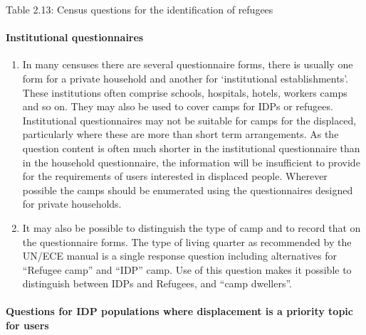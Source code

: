 \documentclass[
]{article}
\begin{document}
Table 2.13: Census questions for the identification of refugees

\hypertarget{institutional-questionnaires-1}{%
\paragraph{Institutional questionnaires}\label{institutional-questionnaires-1}}

\begin{enumerate}
\def\labelenumi{\arabic{enumi}.}
\setcounter{enumi}{91}
\item
  In many censuses there are several questionnaire forms, there is
  usually one form for a private household and another for
  `institutional establishments'. These institutions often comprise
  schools, hospitals, hotels, workers camps and so on. They may also
  be used to cover camps for IDPs or refugees. Institutional
  questionnaires may not be suitable for camps for the displaced,
  particularly where these are more than short term arrangements. As
  the question content is often much shorter in the institutional
  questionnaire than in the household questionnaire, the information
  will be insufficient to provide for the requirements of users
  interested in displaced people. Wherever possible the camps should
  be enumerated using the questionnaires designed for private
  households.
\item
  It may also be possible to distinguish the type of camp and to
  record that on the questionnaire forms. The type of living quarter
  as recommended by the UN/ECE manual is a single response question
  including alternatives for ``Refugee camp'' and ``IDP'' camp. Use of
  this question makes it possible to distinguish between IDPs and
  Refugees, and ``camp dwellers''.
\end{enumerate}

\hypertarget{questions-for-idp-populations-where-displacement-is-a-priority-topic-for-users-1}{%
\paragraph{Questions for IDP populations where displacement is a priority topic for users}\label{questions-for-idp-populations-where-displacement-is-a-priority-topic-for-users-1}}
\end{document}
